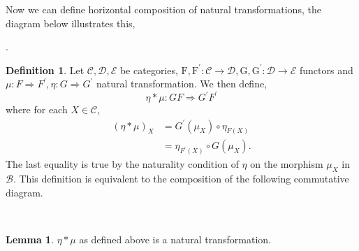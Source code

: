 \documentclass[11pt,a4paper]{article}
\theoremstyle{definition}
\newtheorem{lemma}[thm]{Lemma}
\newtheorem{definition}[thm]{Definition}
\newcommand\cat[1]{\mathscr{#1}}
\newcommand\func[3]{\mathrm{#1}\colon#2\rightarrow#3}
\newcommand\nattran[3]{#1\colon#2\Rightarrow#3}
\numberwithin{equation}{section}
\begin{document}
Now we can define horizontal composition of natural transformations, the diagram below illustrates this,
\begin{center}
.
\end{center}
\begin{definition}
\label{def:horizontalcomposition}
Let $\cat{C},\cat{D},\cat{E}$ be categories, $\func{F,F^{\prime}}{\cat{C}}{\cat{D}},\func{G,G^{\prime}}{\cat{D}}{\cat{E}}$ functors and $\nattran{\mu}{F}{F^{\prime}},\nattran{\eta}{G}{G^{\prime}}$ natural transformation. We then define,
\[\eta*\mu\colon GF\Rightarrow G^{\prime}F^{\prime}\]
where for each $X\in\cat{C}$,
\begin{align*}
 (\eta*\mu)_{X}&=G^\prime(\mu_{X})\circ\eta_{F(X)}\\
    &=\eta_{F^{\prime}(X)}\circ G(\mu_{X}).
\end{align*}
The last equality is true by the naturality condition of $\eta$ on the morphism $\mu_{X}$ in $\cat{B}$. This definition is equivalent to the composition of the following commutative diagram.
\begin{center}
\\
\end{center}
\end{definition}
\begin{lemma}
$\eta*\mu$ as defined above is a natural transformation.
\end{lemma}
\end{document}
